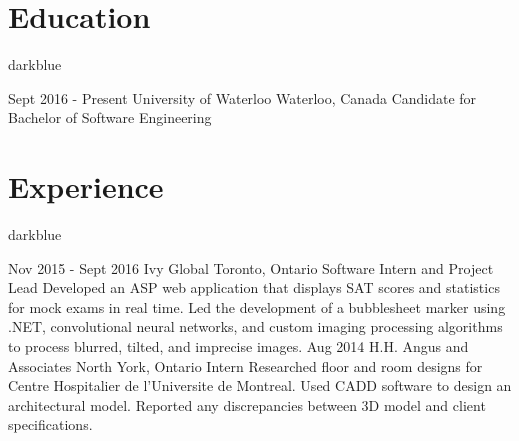 \documentclass{resume}
\begin{document}
	\begin{main}
		\vspace{5pt}%
		\section{Education}{darkblue}
			\begin{entrylist}
				\rightentry%
				{Sept 2016 - Present}%
				{University of Waterloo}%
				{Waterloo, Canada}%
				{Candidate for Bachelor of Software Engineering}%
				{}
			\end{entrylist}
		\vspace{-10pt}%
		\section{Experience}{darkblue}
			\begin{entrylist}
				\rightentry%
					{Nov 2015 - Sept 2016}%
					{Ivy Global}%
					{Toronto, Ontario}%
					{Software Intern and Project Lead}%
					{Developed an ASP web application that displays SAT scores and statistics for mock exams in real time. Led the development of a bubblesheet marker using .NET, convolutional neural networks, and custom imaging processing algorithms to process blurred, tilted, and imprecise images.}
				\rightentry%
					{Aug 2014}%
					{H.H. Angus and Associates}%
					{North York, Ontario}%
					{Intern}%
					{Researched floor and room designs for Centre Hospitalier de l'Universite de Montreal. Used CADD software to design an architectural model. Reported any discrepancies between 3D model and client specifications.}
			\end{entrylist}

\end{main}
\end{document}
